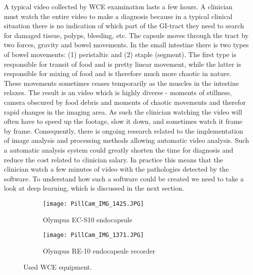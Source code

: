 \documentclass[thesis.tex]{subfiles}
\begin{document}
A typical video collected by WCE examination lasts a few hours. A clinician must watch the entire video to make a diagnosis because in a typical clinical situation there is no indication of which part of the GI-tract they need to search for damaged tissue, polyps, bleeding, etc. The capsule moves through the tract by two forces, gravity and bowel movements. In the small intestine there is two types of bowel movements: (1) peristaltic and (2) staple (segment). The first type is responsible for transit of food and is pretty linear movement, while the latter is responsible for mixing of food and is therefore much more chaotic in nature. These movements sometimes ceases temporarily as the muscles in the intestine relaxes. The result is an video which is highly diverse - moments of stillness, camera obscured by food debris and moments of chaotic movements and therefor rapid changes in the imaging area. As such the clinician watching the video will often have to speed up the footage, slow it down, and sometimes watch it frame by frame.
Consequently, there is ongoing research related to the implementation of image analysis and processing methods allowing automatic video analysis. Such a automatic analysis system could greatly shorten the time for diagnosis and reduce the cost related to clinician salary. In practice this means that the clinician watch a few minutes of video with the pathologies detected by the software. To understand how such a software could be created we need to take a look at deep learning, which is discussed in the next section.

\begin{figure} %
  \centering
  \begin{subfigure}[b]{0.4\linewidth}
    \centering
    \texttt{[image: PillCam\_IMG\_1425.JPG]}
    \caption{Olympus EC-S10 endocapsule}
    \label{fig:ec-s10}
  \end{subfigure}
  \begin{subfigure}[b]{0.4\linewidth}
    \centering
    \texttt{[image: PillCam\_IMG\_1371.JPG]}
    \caption{Olympus RE-10 endocapsule recorder}
    \label{fig:re-10}
  \end{subfigure}
  \caption[Used WCE equipment.]{Used WCE equipment.}
  \label{fig:olympus_endocapsule_10}
\end{figure}
\end{document}
